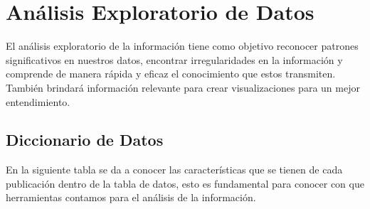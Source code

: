 \documentclass{report}
\begin{document}
\chapter{Análisis Exploratorio de Datos}
El análisis exploratorio de la información tiene como objetivo reconocer patrones significativos en nuestros datos, encontrar irregularidades en la información y comprende de manera rápida y eficaz el conocimiento que estos transmiten. También brindará información relevante para crear visualizaciones para un mejor entendimiento.
    
\section{Diccionario de Datos}
En la siguiente tabla se da a conocer las características que se tienen de cada publicación dentro de la tabla de datos, esto es fundamental para conocer con que herramientas contamos para el análisis de la información.
    
\end{document}
